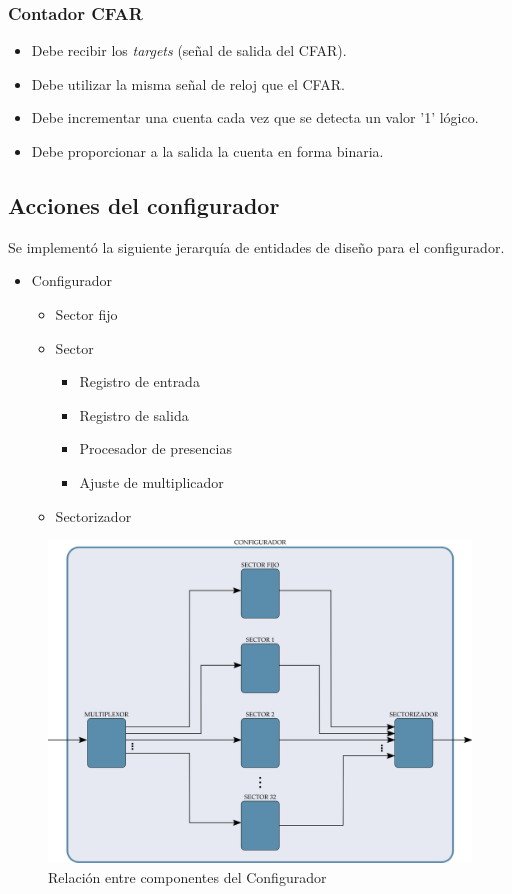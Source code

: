 \subsubsection{Contador CFAR}
\label{subsubseccion: Contador CFAR}
\begin{itemize}
\item Debe recibir los \textit{targets} (señal de salida del CFAR).
\item Debe utilizar la misma señal de reloj que el CFAR.
\item Debe incrementar una cuenta cada vez que se detecta un valor '1' lógico.
\item Debe proporcionar a la salida la cuenta en forma binaria.
\end{itemize}






\subsection{Acciones del configurador}
Se implementó la siguiente jerarquía de entidades de diseño para el configurador.

\begin{itemize}
\item Configurador
	\begin{itemize}
	\item Sector fijo
	\item Sector
		\begin{itemize}
		\item Registro de entrada
		\item Registro de salida
		\item Procesador de presencias
		\item Ajuste de multiplicador
		\end{itemize}

	\item Sectorizador
	\end{itemize}
\end{itemize}

\begin{figure}
\centering
\includegraphics[scale=0.4]{./Figures/configurador_diag_bloques.png}
\caption{Relación entre componentes del Configurador}
\label{diagrama_configurador}
\end{figure}


